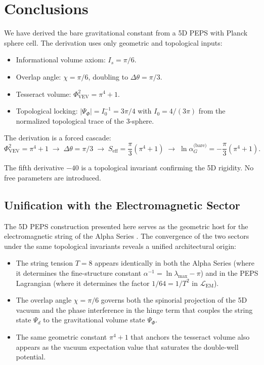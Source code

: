 \documentclass[12pt]{article}
\begin{document}
\section{Conclusions}

We have derived the bare gravitational constant from a 5D PEPS with Planck sphere cell. The derivation uses only geometric and topological inputs:

\begin{itemize}
    \item Informational volume axiom: \(I_s = \pi/6\).
    \item Overlap angle: \(\chi = \pi/6\), doubling to \(\Delta\theta = \pi/3\).
    \item Tesseract volume: \(\Phi_{\text{VEV}}^2 = \pi^4 + 1\).
    \item Topological locking: \(|\Psi_\Phi| = I_0^{-1} = 3\pi/4\) with \(I_0 = 4/(3\pi)\) from the normalized topological trace of the 3-sphere.
\end{itemize}

The derivation is a forced cascade:
\[
\Phi_{\text{VEV}}^2 = \pi^4+1 \;\longrightarrow\; \Delta\theta = \pi/3 \;\longrightarrow\; S_{\text{eff}} = \frac{\pi}{3}(\pi^4+1) \;\longrightarrow\; \ln\alpha_G^{\text{(bare)}} = -\frac{\pi}{3}(\pi^4+1).
\]

The fifth derivative \(-40\) is a topological invariant confirming the 5D rigidity. No free parameters are introduced.

\subsection*{Unification with the Electromagnetic Sector}

The 5D PEPS construction presented here serves as the geometric host for the electromagnetic string of the Alpha Series \cite{alpha_series}. The convergence of the two sectors under the same topological invariants reveals a unified architectural origin:

\begin{itemize}
    \item The string tension \(T = 8\) appears identically in both the Alpha Series (where it determines the fine-structure constant \(\alpha^{-1} = \ln\lambda_{\text{max}} - \pi\)) and in the PEPS Lagrangian (where it determines the factor \(1/64 = 1/T^2\) in \(\mathcal{L}_{\text{EM}}\)).
    \item The overlap angle \(\chi = \pi/6\) governs both the spinorial projection of the 5D vacuum and the phase interference in the hinge term that couples the string state \(\Psi_d\) to the gravitational volume state \(\Psi_\Phi\).
    \item The same geometric constant \(\pi^4 + 1\) that anchors the tesseract volume also appears as the vacuum expectation value that saturates the double-well potential.
\end{itemize}
\end{document}

